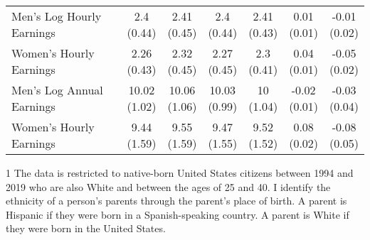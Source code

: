 \begin{table}[!h]
{\begin{threeparttable}
\begin{tabular}[t]{lcccccc}
\addlinespace
\hspace{1em}Men’s Log Hourly Earnings & \specialcell{2.4\\(0.44)} & \specialcell{2.41\\(0.45)} & \specialcell{2.4\\(0.44)} & \specialcell{2.41\\(0.43)} & \specialcell{0.01\\(0.01)} & \specialcell{-0.01\\(0.02)}\\
\hspace{1em}Women’s Hourly Earnings & \specialcell{2.26\\(0.43)} & \specialcell{2.32\\(0.45)} & \specialcell{2.27\\(0.45)} & \specialcell{2.3\\(0.41)} & \specialcell{0.04\\(0.01)} & \specialcell{-0.05\\(0.02)}\\
\hspace{1em}Men’s Log Annual Earnings & \specialcell{10.02\\(1.02)} & \specialcell{10.06\\(1.06)} & \specialcell{10.03\\(0.99)} & \specialcell{10\\(1.04)} & \specialcell{-0.02\\(0.01)} & \specialcell{-0.03\\(0.04)}\\
\hspace{1em}Women’s Hourly Earnings & \specialcell{9.44\\(1.59)} & \specialcell{9.55\\(1.59)} & \specialcell{9.47\\(1.55)} & \specialcell{9.52\\(1.52)} & \specialcell{0.08\\(0.02)} & \specialcell{-0.08\\(0.05)}\\
\bottomrule
\end{tabular}
\begin{tablenotes}
\item[1] The data is restricted to native-born United States citizens between 1994 and 2019 who are also White and between the ages of 25 and 40. I identify the ethnicity of a person's parents through the parent's place of birth. A parent is Hispanic if they were born in a Spanish-speaking country. A parent is White if they were born in the United States.

\end{tablenotes}
\end{threeparttable}}
\end{table}

